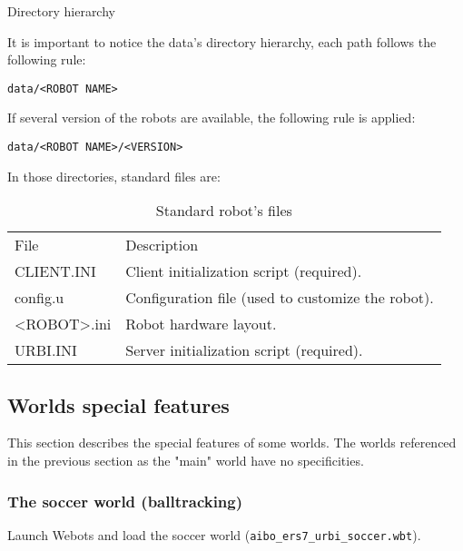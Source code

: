 \begin{table}[htbp]
\caption{Directory hierarchy}
\label{webots.builtin.directory}%
\end{table}

 It is important to notice the data's directory hierarchy, each path follows
the following rule:


\begin{lstlisting}
data/<ROBOT NAME>
\end{lstlisting}

If several version of the robots are available, the following
rule is applied:

\begin{lstlisting}
data/<ROBOT NAME>/<VERSION>
\end{lstlisting}

 In those directories, standard files are:

\begin{table}[htbp]
\begin{center}
\begin{tabular}{ll}\hline
  File &        Description \\
  CLIENT.INI &  Client initialization script (required). \\
  config.u &    Configuration file (used to customize the robot). \\
  <ROBOT>.ini & Robot hardware layout. \\
  URBI.INI &    Server initialization script (required). \\
\hline
\end{tabular}
\end{center}

\caption{Standard robot's files}
\label{webots.builtin.files}%
\end{table}

\subsection{Worlds special features}
\label{webots.builtin.worlds}%

 This section describes the special features of some worlds.
The worlds referenced in the previous section as the "main"
world have no specificities.


\subsubsection{The soccer world (balltracking)}
\label{webots.builtin.worlds.soccer}%

 Launch Webots and load the soccer world
(\nolinkurl{aibo_ers7_urbi_soccer.wbt}).


